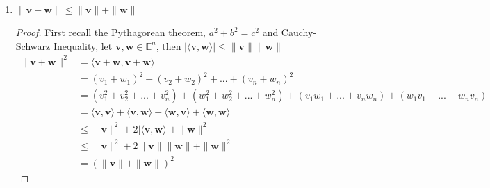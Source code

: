 \documentclass{tufte-book}
\theoremstyle{mytheoremstyle}
\theoremstyle{mylemstyle}
\theoremstyle{mydefstyle}
\begin{document}
\begin{enumerate}
\begin{proof}
\begin{align*}
\|\alpha \mathbf{v} \| &= \sqrt{\langle\alpha\mathbf{v},\alpha\mathbf{v}\rangle} \\
&= \sqrt{(\alpha^2v_1^2 +\alpha^2v_2^2 + \alpha^2v_3^2 +...+\alpha^2v_n^2)} \\
&= \sqrt{\alpha^2(v_1^2 + v_2^2 +v_3^2 +...+v_n^2)} \\
&= |\alpha| \sqrt{(v_1^2 + v_2^2 +v_3^2 +...+v_n^2)} \\
&= |\alpha| \sqrt{\langle \mathbf{v}, \mathbf{v} \rangle} \\
&= |\alpha| \|\mathbf{v}\|
\end{align*}
\end{proof}

\item $\|\mathbf{v} + \mathbf{w} \| \leq \|\mathbf{v}\| + \|\mathbf{w}\|$

\begin{proof}

First recall the Pythagorean theorem, $a^2 + b^2 = c^2$ and Cauchy-Schwarz Inequality, let $\mathbf{v}, \mathbf{w} \in \mathbb{E}^n$, then $|\langle \mathbf{v}, \mathbf{w} \rangle| \leq \|\mathbf{v}\|\|\mathbf{w}\|$
\begin{align*}
\|\mathbf{v} + \mathbf{w} \|^2 &= \langle \mathbf{v}+\mathbf{w},\mathbf{v}+\mathbf{w}\rangle \\
&= (v_1+w_1)^2 + (v_2+w_2)^2 +...+(v_n+w_n)^2\\
&= (v_1^2 + v_2^2 +...+v_n^2) + (w_1^2+w_2^2+...+w_n^2) + (v_1w_1+...+v_nw_n) +(w_1v_1+...+w_nv_n) \\ 
&= \langle \mathbf{v},\mathbf{v}\rangle + \langle \mathbf{v}, \mathbf{w} \rangle + \langle \mathbf{w}, \mathbf{v} \rangle + \langle \mathbf{w},\mathbf{w}\rangle \\
&\leq \|\mathbf{v}\|^2 + 2|\langle \mathbf{v}, \mathbf{w} \rangle| + \|\mathbf{w}\|^2 \\
&\leq \|\mathbf{v}\|^2 + 2\|\mathbf{v}\|\|\mathbf{w}\| + \|\mathbf{w}\|^2 \\
&= (\|\mathbf{v}\| + \|\mathbf{w}\|)^2
\end{align*}

\end{proof}


\end{enumerate}
\end{document}
